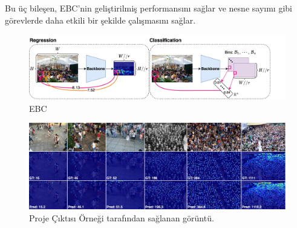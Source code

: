 \documentclass[10pt,a4paper]{report}
\begin{document}
	 Bu üç bileşen, EBC'nin geliştirilmiş performansını sağlar ve nesne sayımı gibi görevlerde daha etkili bir şekilde çalışmasını sağlar.
	 
	 	\begin{figure}[!ht]
	 	\raggedright
	 	\includegraphics[width=\textwidth]{regression1}
	 	\caption{EBC \cite{idrees2018composition}}
	 	\label{Ornek_sonuc1}
	 \end{figure}

	 \begin{landscape} %
	 	
	 	\begin{figure}[p]
	 		\centering
	 		\includegraphics[width=\linewidth]{visualization}
	 		\caption{Proje Çıktısı Örneği \cite{ma2024clip} tarafından sağlanan görüntü.}
	 	\end{figure}
	 	
	 \end{landscape}
	 
	
	
	\clearpage
	

	
	
\end{document}

